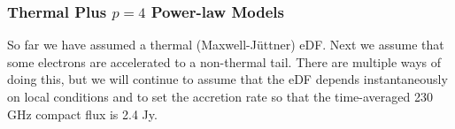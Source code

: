 

\subsubsection{Thermal Plus $p = 4$ Power-law Models}

So far we have assumed a thermal (Maxwell-J{\"u}ttner) eDF.  Next we assume that some electrons are accelerated to a non-thermal tail.  There are multiple ways of doing this, but we will continue to assume that the eDF depends instantaneously on local conditions and to set the accretion rate so that the time-averaged 230\,GHz compact flux is 2.4 Jy.

